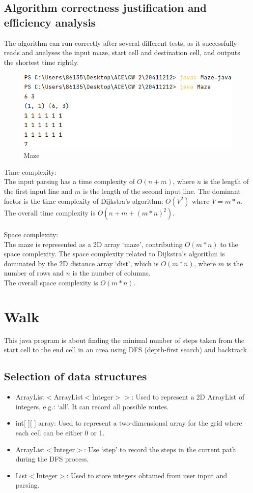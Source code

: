 \documentclass{article}
\begin{document}
\subsection{Algorithm correctness justification and efficiency analysis}
The algorithm can run correctly after several different tests, as it successfully reads and analyses the input maze,  start cell and destination cell, and outputs the shortest time rightly. 
\begin{figure}[H]
\centering
\includegraphics[scale=0.6]{Maze.png}
\caption{Maze}
\end{figure}
Time complexity:\\
The input parsing has a time complexity of $O(n + m)$, where $n$ is the length of the first input line and $m$ is the length of the second input line. The dominant factor is the time complexity of Dijkstra's algorithm: $O(V^2)$ where $V = m * n$.\\
The overall time complexity is $O(n + m + (m*n)^2)$.\\~\\
Space complexity:\\
The maze is represented as a 2D array `maze', contributing $O(m * n)$ to the space complexity. The space complexity related to Dijkstra's algorithm is dominated by the 2D distance array `dist', which is $O(m * n)$, where $m$ is the number of rows and $n$ is the number of columns.\\
The overall space complexity is $O(m * n)$.
\section{Walk}
This java program is about finding the minimal number of steps taken from the start cell to the end cell in an area using DFS (depth-first search) and backtrack.
\subsection{Selection of data structures}
\begin{itemize}
\item ArrayList$<$ArrayList$<$Integer$>>$: Used to represent a 2D ArrayList of integers, e.g.: `all'. It can record all possible routes.
\item int[ ][ ] array: Used to represent a two-dimensional array for the grid where each cell can be either 0 or 1.
\item ArrayList$<$Integer$>$: Use `step' to record the steps in the current path during the DFS process.
\item List$<$Integer$>$: Used to store integers obtained from user input and parsing.
\end{itemize}
\end{document}
